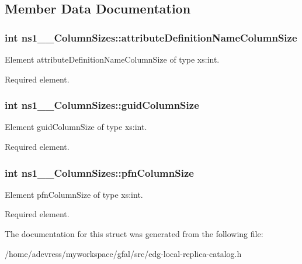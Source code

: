 \subsection{Member Data Documentation}
\subsubsection{\setlength{\rightskip}{0pt plus 5cm}int \bf{ns1\_\-\_\-Column\-Sizes::attribute\-Definition\-Name\-Column\-Size}}\label{structns1____ColumnSizes_ea49ae840f5f108da7482bd88feb5060}


Element attribute\-Definition\-Name\-Column\-Size of type xs:int. 

Required element. 
\subsubsection{\setlength{\rightskip}{0pt plus 5cm}int \bf{ns1\_\-\_\-Column\-Sizes::guid\-Column\-Size}}\label{structns1____ColumnSizes_1692faf7863a09c5d65f13bfda519458}


Element guid\-Column\-Size of type xs:int. 

Required element. 
\subsubsection{\setlength{\rightskip}{0pt plus 5cm}int \bf{ns1\_\-\_\-Column\-Sizes::pfn\-Column\-Size}}\label{structns1____ColumnSizes_797c550db1349e5ff573a51ca7ccf1b5}


Element pfn\-Column\-Size of type xs:int. 

Required element. 

The documentation for this struct was generated from the following file:\begin{CompactItemize}
\item 
/home/adevress/myworkspace/gfal/src/edg-local-replica-catalog.h\end{CompactItemize}
